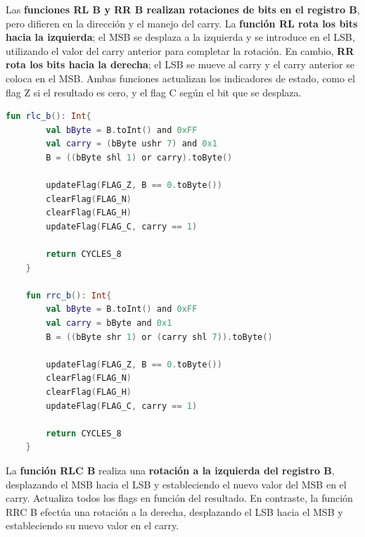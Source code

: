 Las \textbf{funciones RL B y RR B realizan rotaciones de bits en el registro B}, pero difieren en la dirección y el manejo del carry. La \textbf{función RL rota los bits hacia la izquierda}; el MSB se desplaza a la izquierda y se introduce en el LSB, utilizando el valor del carry anterior para completar la rotación. En cambio, \textbf{RR rota los bits hacia la derecha}; el LSB se mueve al carry y el carry anterior se coloca en el MSB. Ambas funciones actualizan los indicadores de estado, como el flag Z si el resultado es cero, y el flag C según el bit que se desplaza.

\begin{lstlisting}[language=Kotlin, caption={Operaciones RLC y RRC}, label={code:kotlinrlcrrc}]
    fun rlc_b(): Int{
        val bByte = B.toInt() and 0xFF
        val carry = (bByte ushr 7) and 0x1
        B = ((bByte shl 1) or carry).toByte()

        updateFlag(FLAG_Z, B == 0.toByte())
        clearFlag(FLAG_N)
        clearFlag(FLAG_H)
        updateFlag(FLAG_C, carry == 1)

        return CYCLES_8
    }

    fun rrc_b(): Int{
        val bByte = B.toInt() and 0xFF
        val carry = bByte and 0x1
        B = ((bByte shr 1) or (carry shl 7)).toByte()

        updateFlag(FLAG_Z, B == 0.toByte())
        clearFlag(FLAG_N)
        clearFlag(FLAG_H)
        updateFlag(FLAG_C, carry == 1)

        return CYCLES_8
    }
\end{lstlisting}

La \textbf{función RLC B} realiza una \textbf{rotación a la izquierda del registro B}, desplazando el MSB hacia el LSB y estableciendo el nuevo valor del MSB en el carry. Actualiza todos los flags en función del resultado. En contraste, la función RRC B efectúa una rotación a la derecha, desplazando el LSB hacia el MSB y estableciendo su nuevo valor en el carry.

